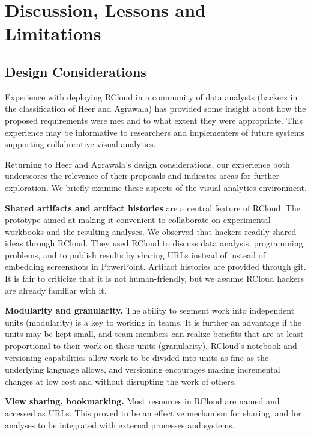 \section{Discussion, Lessons and Limitations}
\label{sec:limitations}

\subsection{Design Considerations}

Experience with deploying RCloud in a community of data analysts
(hackers in the classification of Heer and Agrawala)
has provided some insight about how the proposed requirements
were met and to what extent they were appropriate.
This experience may be informative to researchers and implementers
of future systems supporting collaborative visual analytics.

Returning to Heer and Agrawala's design considerations, our experience
both underscores the relevance of their proposals and indicates areas
for further exploration. We briefly examine these aspects of the
visual analytics environment.

{\bf Shared artifacts and artifact histories} are a central feature
of RCloud. The prototype aimed at making it convenient to collaborate
on experimental workbooks and the resulting analyses. We observed
that hackers readily shared ideas through RCloud. They used RCloud
to discuss data analysis, programming problems, and to publish results
by sharing URLs instead of instead of embedding screenshots in
PowerPoint. Artifact histories are provided through git. It is fair
to criticize that it is not human-friendly, but we assume RCloud
hackers are already familiar with it.

{\bf Modularity and granularity.} The ability to segment work into
independent units (modularity) is a key to working in teams. It is
further an advantage if the units may be kept small, and team members
can realize benefits that are at least proportional to their work
on these units (granularity). RCloud's notebook and versioning
capabilities allow work to be divided into units as fine as
the underlying language allows, and versioning encourages making
incremental changes at low cost and without disrupting the work
of others.

{\bf View sharing, bookmarking.} Most resources in RCloud are named
and accessed as URLs. This proved to be an effective mechanism for
sharing, and for analyses to be integrated with external processes
and systems.

